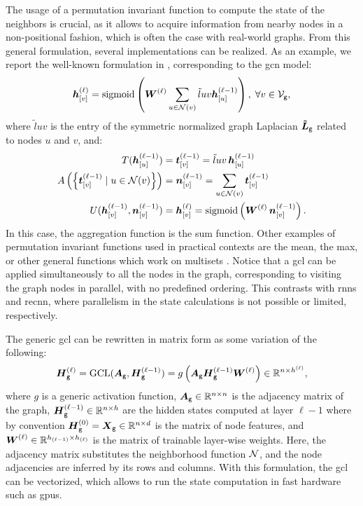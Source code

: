 The usage of a permutation invariant function to compute the state of the neighbors is crucial, as it allows to acquire information from nearby nodes in a non-positional fashion, which is often the case with real-world graphs. From this general formulation, several implementations can be realized. As an example, we report the well-known formulation in \citep{kipf2017semisupervisedgcn}, corresponding to the \gls{gcn} model:
\begin{align}
    \label{eq:convolutional}
    \StateVector{v}{\ell} = \sigmoid\Par{ \LayerMatrix{w}{\ell} \sum_{u \in \Neigh(v)} \tilde{l}{uv}\StateVector{u}{\ell-1}}, \; \forall v \in \Nodes{g},
\end{align}
where $\tilde{l}{uv}$ is the entry of the symmetric normalized graph Laplacian $\NormLaplacianMatrix{g}$ related to nodes $u$ and $v$, and:
\begin{align}
    \label{eq:transform}
    T(\StateVector{u}{\ell-1}) &= \GenStateVector{t}{v}{\ell-1}  = \tilde{l}{uv}\,\StateVector{u}{\ell-1}\\
    \label{eq:aggregate}
    A\Par{\Set{\GenStateVector{t}{v}{\ell-1} \mid u \in \Neigh(v)}} &= \GenStateVector{n}{v}{\ell-1} = \sum_{u \in \Neigh(v)} \GenStateVector{t}{v}{\ell-1}\\
    \label{eq:update}
    U(\StateVector{v}{\ell-1}, \GenStateVector{n}{v}{\ell-1}) &= \StateVector{v}{\ell} =  \sigmoid\Par{\LayerMatrix{w}{\ell}\, \GenStateVector{n}{v}{\ell-1}}.
\end{align}
In this case, the aggregation function is the sum function. Other examples of permutation invariant functions used in practical contexts are the mean, the max, or other general functions which work on multisets \citep{zaheer2017deepsets}. Notice that a \gls{gcl} can be applied simultaneously to all the nodes in the graph, corresponding to visiting the graph nodes in parallel, with no predefined ordering. This contrasts with \glspl{rnn} and \gls{recnn}, where parallelism in the state calculations is not possible or limited, respectively.

The generic \gls{gcl} can be rewritten in matrix form as some variation of the following:
$$\LayerStateMat{g}{\ell} = \Fun{GCL}(\AdjMatrix{g}, \LayerStateMat{g}{\ell-1}) = g\Par{\AdjMatrix{g}\LayerStateMat{g}{\ell-1}\LayerMatrix{w}{\ell}} \in \Real^{n \times h^{(\ell)}},$$
where $g$ is a generic activation function, $\AdjMatrix{g} \in \Real^{n \times n}$ is the adjacency matrix of the graph, $\LayerStateMat{g}{\ell-1} \in \Real^{n \times h}$ are the hidden states computed at layer $\ell-1$ where by convention $\LayerStateMat{g}{0} = \FeatureMatrix{g} \in \Real^{n \times d}$ is the matrix of node features, and $\LayerMatrix{w}{\ell} \in \Real^{h_{(\ell-1)} \times h_{(\ell)}}$ is the matrix of trainable layer-wise weights. Here, the adjacency matrix substitutes the neighborhood function $\Neigh$, and the node adjacencies are inferred by its rows and columns. With this formulation, the \gls{gcl} can be vectorized, which allows to run the state computation in fast hardware such as \glspl{gpu}.

